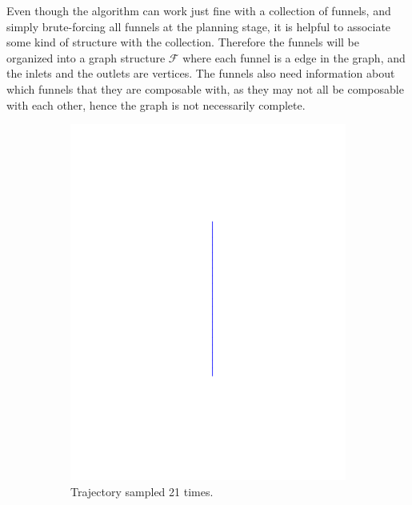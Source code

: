 Even though the \rrtfunnel{} algorithm can work just fine with a collection of
funnels, and simply brute-forcing all funnels at the planning stage, it is
helpful to associate some kind of structure with the collection. Therefore the
funnels will be organized into a graph structure \(\mathcal{F}\) where each
funnel is a edge in the graph, and the inlets and the outlets are vertices. The
funnels also need information about which funnels that they are composable with,
as they may not all be composable with each other, hence the graph is not
necessarily complete.

\begin{figure}
  \centering
  \begin{subfigure}[b]{0.5\textwidth}
    \includegraphics[trim={5cm 5cm 5cm 5cm},
    width=\textwidth]{figures/method/trajectory-sampled}
    \caption{Trajectory sampled 21 times.\newline}
  \end{subfigure}%
  \begin{subfigure}[b]{0.5\textwidth}

\end{subfigure}
\end{figure}
